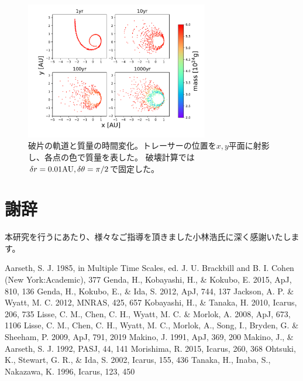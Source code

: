 \documentclass[a4paper,10pt,oneside,twocolumn,notitlepage,final]{jarticle}
\begin{document}
\begin{figure}[h]
 \centering
 \includegraphics[width=8cm]{L2cone30equidistant_v1011curl_OnlyPlanet_1000yr.pdf}
 \caption{破片の軌道と質量の時間変化。トレーサーの位置を$x,y$平面に射影し、各点の色で質量を表した。
 破壊計算では$\delta r = 0.01 {\rm AU}, \delta \theta = \pi/2$で固定した。\label{fig:L2cone}}
\end{figure}









\section*{謝辞}
本研究を行うにあたり、様々なご指導を頂きました小林浩氏に深く感謝いたします。

\small
\begin{thebibliography}{99}
 Aarseth, S. J. 1985, in Multiple Time Scales, ed. J. U. Brackbill and B. I. Cohen (New York:Academic), 377
 Genda, H., Kobayashi, H., \& Kokubo, E. 2015, ApJ, 810, 136 
 Genda, H., Kokubo, E., \& Ida, S. 2012, ApJ, 744, 137
 Jackson, A. P. \& Wyatt, M. C. 2012, MNRAS, 425, 657
 Kobayashi, H., \& Tanaka, H. 2010, Icarus, 206, 735
 Lisse, C. M., Chen, C. H., Wyatt, M. C. \& Morlok, A. 2008, ApJ, 673, 1106
 Lisse, C. M., Chen, C. H., Wyatt, M. C., Morlok, A., Song, I., Bryden, G. \& Sheeham, P. 2009, ApJ, 791, 2019
 Makino, J. 1991, ApJ, 369, 200
 Makino, J., \& Aarseth, S. J. 1992, PASJ, 44, 141
 Morishima, R. 2015, Icarus, 260, 368
 Ohtsuki, K., Stewart, G. R., \& Ida, S. 2002, Icarus, 155, 436
 Tanaka, H., Inaba, S., Nakazawa, K. 1996, Icarus, 123, 450
 
\end{thebibliography}
\end{document}
